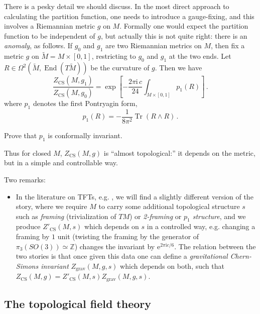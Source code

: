 \documentclass[12pt,letterpaper,reqno]{amsart}
\numberwithin{equation}{section}
\newcommand{\bbZ}{\ensuremath{\mathbb Z}}
\newcommand{\I}{{\mathrm i}}
\newcommand{\e}{{\mathrm e}}
\newcommand{\CS}{\textrm{CS}}
\newcommand{\grav}{\textrm{grav}}
\newcommand{\ti}[1]{\textit{#1}}
\DeclareMathOperator{\Tr}{Tr}
\DeclareMathOperator{\End}{End}
\begin{document}
There is a pesky detail we should discuss.
In the most direct approach to calculating the partition function, 
one needs to introduce a gauge-fixing, and this involves
a Riemannian metric $g$ on $M$.
Formally one would
expect the partition function to be independent of $g$, but 
actually this is not quite right:
there is an \ti{anomaly}, as follows.
If $g_0$ and $g_1$ are two Riemannian metrics on $M$, then
fix a metric $g$ on $\widetilde{M} = M \times[0,1]$, 
restricting to $g_0$ and $g_1$ at the two ends.
Let $R\in \Omega^2(\widetilde{M},\End(T\widetilde{M}))$ be the
curvature of $g$.
Then we have
\begin{equation} \label{eq:Z-cs-anomaly}
\frac{Z_{\mathrm{CS}}(M,g_1)}{Z_{\mathrm{CS}}(M,g_0)}
=
\exp \left[ -\frac{2 \pi \I\, c}{24}\int_{M\times[0,1]} p_1(R) \right] \, .
\end{equation}
where $p_1$ denotes the first Pontryagin form,
\[
p_1(R) = -\frac{1}{8\pi^2}\Tr(R\wedge R) \, .
\]
\begin{exercise} Prove that $p_1$ is conformally invariant.
\end{exercise}
Thus for closed $M$, $Z_{\CS}(M,g)$ is ``almost topological:'' it depends on the metric, but 
in a simple and controllable way.

Two remarks:

\begin{itemize}
\item In the literature on TFTs, e.g. \cite{ReshetikhinTuraev1991}, we will find a slightly different
version of the story, where we require $M$ to carry some additional topological structure $s$ such as \ti{framing}
(trivialization of $TM$) or \ti{2-framing} or \ti{$p_1$ structure}, and we produce 
$Z'_\CS(M,s)$ which depends on $s$ in a 
controlled way, e.g. changing a framing by $1$ unit 
(twisting the framing by the generator of $\pi_3(SO(3)) \simeq \bbZ$)
changes the invariant by $\e^{2 \pi \I c / 6}$.
The relation between the two stories is that once given this data one can define a 
\ti{gravitational Chern-Simons invariant} $Z_\grav(M,g,s)$ which depends on both, such that
$Z_\CS(M,g) = Z'_\CS(M,s) Z_\grav(M,g,s)$.
\end{itemize}



\subsection{The topological field theory}
\end{document}
